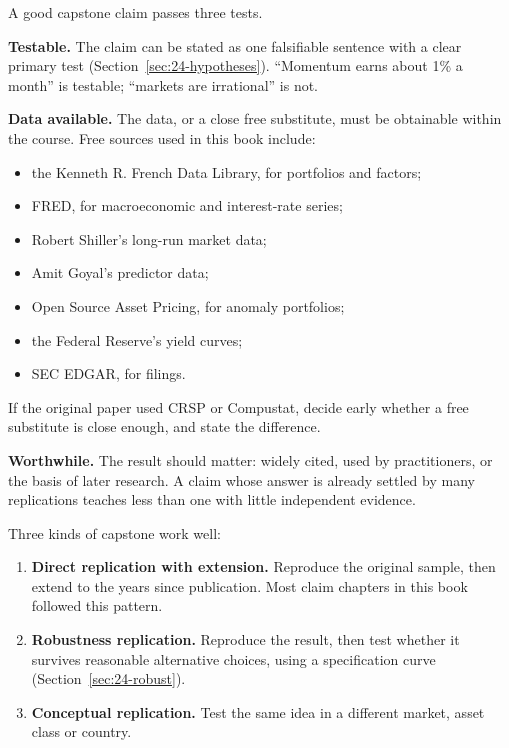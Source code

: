 A good capstone claim passes three tests.

\textbf{Testable.} The claim can be stated as one falsifiable sentence with a clear primary test (Section~\ref{sec:24-hypotheses}). ``Momentum earns about 1\% a month'' is testable; ``markets are irrational'' is not.

\textbf{Data available.} The data, or a close free substitute, must be obtainable within the course. Free sources used in this book include:

\begin{itemize}
  \item the Kenneth R. French Data Library, for portfolios and factors;
  \item FRED, for macroeconomic and interest-rate series;
  \item Robert Shiller's long-run market data;
  \item Amit Goyal's predictor data;
  \item Open Source Asset Pricing, for anomaly portfolios;
  \item the Federal Reserve's yield curves;
  \item SEC EDGAR, for filings.
\end{itemize}

If the original paper used CRSP or Compustat, decide early whether a free substitute is close enough, and state the difference.

\textbf{Worthwhile.} The result should matter: widely cited, used by practitioners, or the basis of later research. A claim whose answer is already settled by many replications teaches less than one with little independent evidence.

Three kinds of capstone work well:

\begin{enumerate}
  \item \textbf{Direct replication with extension.} Reproduce the original sample, then extend to the years since publication. Most claim chapters in this book followed this pattern.
  \item \textbf{Robustness replication.} Reproduce the result, then test whether it survives reasonable alternative choices, using a specification curve (Section~\ref{sec:24-robust}).
  \item \textbf{Conceptual replication.} Test the same idea in a different market, asset class or country.
\end{enumerate}

